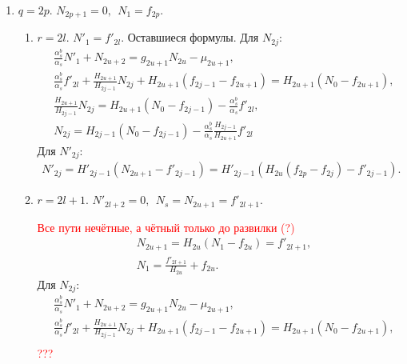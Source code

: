 \begin{enumerate}
    \begin{enumerate}
        \item \(q=2p\). \(N_{2p+1} = 0, ~~ N_1 = f_{2p}\).
        \begin{enumerate}
            \item \(r=2l\). \(N'_1 = f'_{2l}\). Оставшиеся формулы. Для \(N_{2j}\):
            \begin{equation*}
                \begin{split}
                    & \frac{\alpha^b_s}{\alpha_s} N'_1 + N_{2u+2} = g_{2u+1} N_{2u} - \mu_{2u+1}, \\
                    & \frac{\alpha^b_s}{\alpha_s} f'_{2l} + \frac{H_{2u+1}}{H_{2j-1}} N_{2j} + H_{2u+1} (f_{2j-1} - f_{2u+1}) = H_{2u+1} (N_0 - f_{2u+1}), \\
                    & \frac{H_{2u+1}}{H_{2j-1}} N_{2j} = H_{2u+1} (N_0 - f_{2j-1}) - \frac{\alpha^b_s}{\alpha_s} f'_{2l}, \\
                    & N_{2j} = H_{2j-1} (N_0 - f_{2j-1}) - \frac{\alpha^b_s}{\alpha_s} \frac{H_{2j-1}}{H_{2u+1}} f'_{2l}
                \end{split}
            \end{equation*}
            Для \(N'_{2j}\):
            \begin{equation*}
                \begin{split}
                    N'_{2j} = H'_{2j-1} (N_{2u+1} - f'_{2j-1}) = H'_{2j-1} ( H_{2u} (f_{2p} - f_{2j}) - f'_{2j-1}).
                \end{split}
            \end{equation*}

            \item \(r=2l+1\). \(N'_{2l+2} = 0, ~~N_s = N_{2u+1} = f'_{2l+1} \).
            
            \textcolor{red}{Все пути нечётные, а чётный только до развилки (?)}
            \begin{equation*}
                \begin{split}
                    & N_{2u+1} = H_{2u} (N_1 - f_{2u}) = f'_{2l+1}, \\
                    & N_1 = \frac{f'_{2l+1}}{H_{2u}} + f_{2u}.
                \end{split}
            \end{equation*}
            Для \(N_{2j}\):
            \begin{equation*}
                \begin{split}
                    & \frac{\alpha^b_s}{\alpha_s} N'_1 + N_{2u+2} = g_{2u+1} N_{2u} - \mu_{2u+1}, \\
                    & \frac{\alpha^b_s}{\alpha_s} f'_{2l} + \frac{H_{2u+1}}{H_{2j-1}} N_{2j} + H_{2u+1} (f_{2j-1} - f_{2u+1}) = H_{2u+1} (N_0 - f_{2u+1}), \\
                \end{split}
            \end{equation*}
            \textcolor{red}{???}
        \end{enumerate} %


\end{enumerate}
\end{enumerate}
